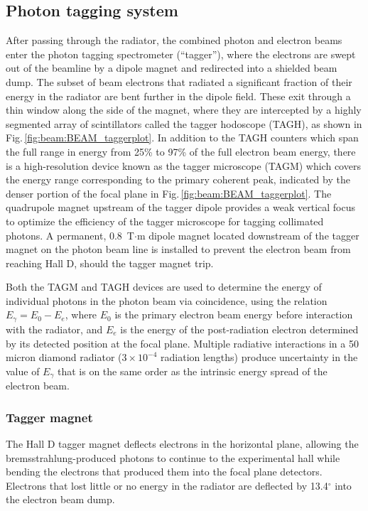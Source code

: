 \subsection{Photon tagging system \label{sec:tag}}
After passing through the radiator, the combined photon and electron beams enter
the photon tagging spectrometer (``tagger''), where the electrons are swept out of
the beamline by a dipole magnet and redirected into a shielded beam dump. The
subset of beam electrons that radiated a significant fraction of their energy in
the radiator are bent further in the dipole field. These exit through a thin window
along the side of the magnet, where they are intercepted by a highly segmented
array of scintillators called the tagger hodoscope (TAGH), as shown in
Fig.\,\ref{fig:beam:BEAM_taggerplot}. In addition to the TAGH counters which span
the full range in energy from 25\% to 97\% of the full electron beam energy, there
is a high-resolution device known as the tagger microscope (TAGM) which covers the
energy range corresponding to the primary coherent peak, indicated by the denser
portion of the focal plane in Fig.\,\ref{fig:beam:BEAM_taggerplot}. 
The quadrupole magnet upstream of the tagger dipole provides a weak vertical focus
to optimize the efficiency of the tagger microscope for tagging collimated photons.
A permanent, 0.8~T$\cdot$m dipole magnet located downstream of the tagger magnet
on the photon beam line is installed to prevent the electron beam from reaching
Hall D, should the tagger magnet trip.

Both the TAGM and TAGH devices are used to determine the energy of individual
photons in the photon beam via coincidence, using
the relation $E_{\gamma} = E_{0} - E_{e}$, where $E_{0}$ is the primary electron
beam energy before interaction with the radiator, and $E_{e}$ is the
energy of the post-radiation electron determined by its detected position at the
focal plane. Multiple radiative interactions in a 50 micron diamond radiator
($3\times 10^{-4}$ radiation lengths) produce uncertainty in the value of
$E_{\gamma}$ that is on the same order as the intrinsic energy spread of the
electron beam.

\subsubsection{Tagger magnet \label{sec:tagMagnet}}
The Hall D tagger magnet deflects electrons in the horizontal plane, allowing the
brems\-strah\-lung-produced photons to continue to the experimental hall while
bending the electrons that produced them into the focal plane detectors.
Electrons that lost little or no energy in the
radiator are deflected by 13.4$^\circ$ into the electron beam dump.

